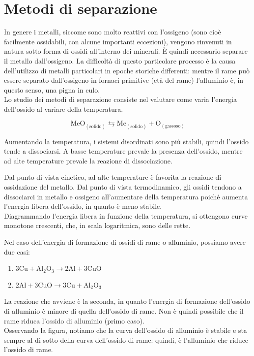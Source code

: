 \section{Metodi di separazione}

In genere i metalli, siccome sono molto reattivi con l'ossigeno (sono cioè facilmente ossidabili, con alcune importanti eccezioni), vengono rinvenuti in natura sotto forma di ossidi all'interno dei minerali. È quindi necessario separare il metallo dall'ossigeno. La difficoltà di questo particolare processo è la causa dell'utilizzo di metalli particolari in epoche storiche differenti: mentre il rame può essere separato dall'ossigeno in fornaci primitive (età del rame) l'alluminio è, in questo senso, una pigna in culo.\\
Lo studio dei metodi di separazione consiste nel valutare come varia l’energia dell’ossido al variare della temperatura.

\begin{equation*}
    \mathrm{MeO_{(solido)}\leftrightarrows Me_{(solido)}+O_{(gassoso)}}
\end{equation*}

Aumentando la temperatura, i sistemi disordinati sono più stabili, quindi l’ossido tende a dissociarsi. A basse temperature prevale la presenza dell’ossido, mentre ad alte temperature prevale la reazione di dissociazione.

Dal punto di vista cinetico, ad alte temperature è favorita la reazione di ossidazione del metallo. Dal punto di vista termodinamico, gli ossidi tendono a dissociarci in metallo e ossigeno all’aumentare della temperatura poiché aumenta l’energia libera dell’ossido, in quanto è meno stabile.\\
Diagrammando l’energia libera in funzione della temperatura, si ottengono curve monotone crescenti, che, in scala logaritmica, sono delle rette.

Nel caso dell’energia di formazione di ossidi di rame o alluminio, possiamo avere due casi:
\begin{enumerate}
    \item $\mathrm{3Cu+Al_2O_3\to2Al+3CuO}$
    \item $\mathrm{2Al+3CuO\to3Cu+Al_2O_3}$
\end{enumerate}

La reazione che avviene è la seconda, in quanto l’energia di formazione dell’ossido di alluminio è minore di quella dell’ossido di rame. Non è quindi possibile che il rame riduca l’ossido di alluminio (primo caso).\\
Osservando la figura, notiamo che la curva dell’ossido di alluminio è stabile e sta sempre al di sotto della curva dell’ossido di rame: quindi, è l’alluminio che riduce l’ossido di rame.


